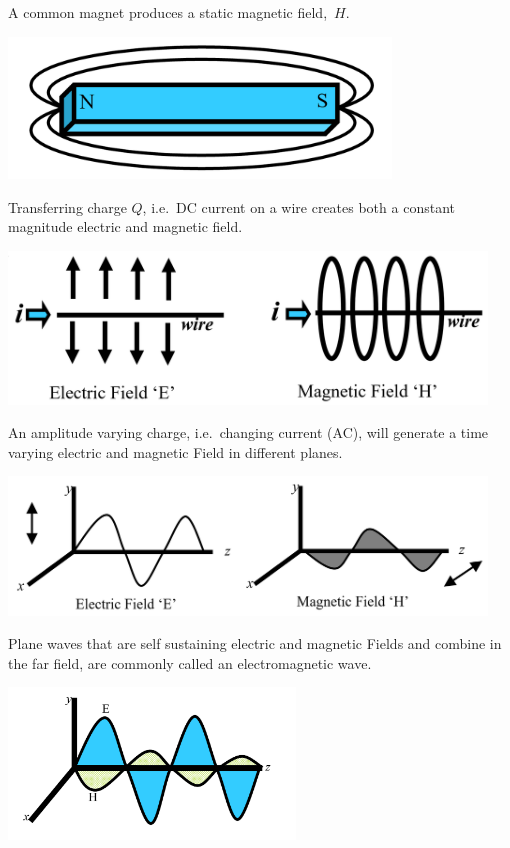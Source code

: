 \documentclass[
]{book}
\begin{document}
A common magnet produces a static magnetic field,~\(H\).

\includegraphics[width=4in,height=\textheight]{media/14/bar-magnet-field.png}

Transferring charge \(Q\), i.e.~DC current on a wire creates both a constant
magnitude electric and magnetic field.

\includegraphics[width=5in,height=\textheight]{media/14/varying-fields.png}

An amplitude varying charge, i.e.~changing current (AC), will generate a time
varying electric and magnetic Field in different planes.

\includegraphics[width=5in,height=\textheight]{media/14/em-wave.png}

Plane waves that are self sustaining electric and magnetic Fields and combine
in the far field, are commonly called an electromagnetic wave.

\includegraphics[width=3in,height=\textheight]{media/14/em-wave-combined.png}
\end{document}
